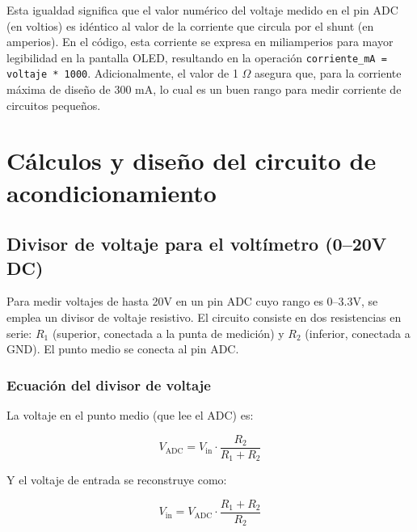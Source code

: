 \documentclass[letterpaper,12pt]{article}
\begin{document}
\begin{itemize}
        Esta igualdad significa que el valor numérico del voltaje medido en el pin ADC (en voltios) es idéntico al valor de la corriente que circula por el shunt (en amperios). En el código, esta corriente se expresa en miliamperios para mayor legibilidad en la pantalla OLED, resultando en la operación \texttt{corriente\_mA = voltaje * 1000}. Adicionalmente, el valor de 1 $\Omega$ asegura que, para la corriente máxima de diseño de 300 mA, lo cual es un buen rango para medir corriente de circuitos pequeños.
        
    \end{itemize}

    \newpage

    \section{Cálculos y diseño del circuito de acondicionamiento}

    \subsection{Divisor de voltaje para el voltímetro (0--20V DC)}

    Para medir voltajes de hasta 20V en un pin ADC cuyo rango es 0--3.3V, se emplea un divisor de voltaje resistivo. El circuito consiste en dos resistencias en serie: $R_1$ (superior, conectada a la punta de medición) y $R_2$ (inferior, conectada a GND). El punto medio se conecta al pin ADC.

    \subsubsection{Ecuación del divisor de voltaje}

    La voltaje en el punto medio (que lee el ADC) es:

    \begin{equation}
        V_{\text{ADC}} = V_{\text{in}} \cdot \frac{R_2}{R_1 + R_2}
        \label{eq:divisor}
    \end{equation}

    Y el voltaje de entrada se reconstruye como:

    \begin{equation}
        V_{\text{in}} = V_{\text{ADC}} \cdot \frac{R_1 + R_2}{R_2}
        \label{eq:vin}
    \end{equation}
\end{document}
